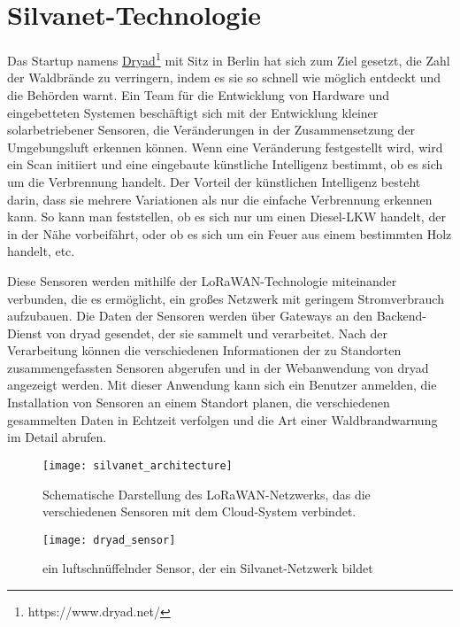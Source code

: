 \section{Silvanet-Technologie}

Das Startup namens \href{https://www.dryad.net/}{Dryad}\footnote{https://www.dryad.net/} mit Sitz in Berlin hat sich zum Ziel gesetzt, die Zahl der Waldbrände zu verringern, indem es sie so schnell wie möglich entdeckt und die Behörden warnt.
Ein Team für die Entwicklung von Hardware und eingebetteten Systemen beschäftigt sich mit der Entwicklung kleiner solarbetriebener Sensoren, die Veränderungen in der Zusammensetzung der Umgebungsluft erkennen können.
Wenn eine Veränderung festgestellt wird, wird ein Scan initiiert und eine eingebaute künstliche Intelligenz bestimmt, ob es sich um die Verbrennung handelt.
Der Vorteil der künstlichen Intelligenz besteht darin, dass sie mehrere Variationen als nur die einfache Verbrennung erkennen kann. So kann man feststellen, ob es sich nur um einen Diesel-LKW handelt, der in der Nähe vorbeifährt, oder ob es sich um ein Feuer aus einem bestimmten Holz handelt, etc.

Diese Sensoren werden mithilfe der LoRaWAN-Technologie miteinander verbunden, die es ermöglicht, ein großes Netzwerk mit geringem Stromverbrauch aufzubauen. Die Daten der Sensoren werden über Gateways an den Backend-Dienst von dryad gesendet, der sie sammelt und verarbeitet.
Nach der Verarbeitung können die verschiedenen Informationen der zu Standorten zusammengefassten Sensoren abgerufen und in der Webanwendung von dryad angezeigt werden.
Mit dieser Anwendung kann sich ein Benutzer anmelden, die Installation von Sensoren an einem Standort planen, die verschiedenen gesammelten Daten in Echtzeit verfolgen und die Art einer Waldbrandwarnung im Detail abrufen.

\begin{figure}[h]
  \centering
  \texttt{[image: silvanet\_architecture]}
  \caption{Schematische Darstellung des LoRaWAN-Netzwerks, das die verschiedenen Sensoren mit dem Cloud-System verbindet.}
\end{figure}


\begin{figure}[h]
  \centering
  \texttt{[image: dryad\_sensor]}
  \caption{ein luftschnüffelnder Sensor, der ein Silvanet-Netzwerk bildet}
\end{figure}

